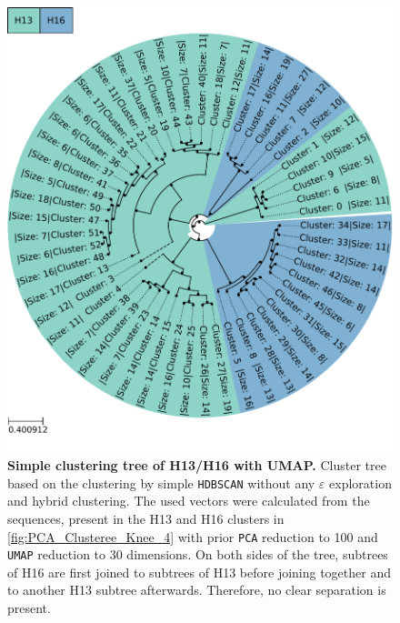 \begin{figure}[!hbt]
    \centering
    \includegraphics[width=\textwidth]{UMAP/Clustertree_Segment_4_H_Simple.pdf}
    \caption[Simple clustering tree of H13/H16 with UMAP]{\textbf{Simple clustering tree of H13/H16 with UMAP.} Cluster tree based on the clustering by simple \texttt{HDBSCAN} without any $\varepsilon$ exploration and hybrid clustering. The used vectors were calculated from the sequences, present in the H13 and H16 clusters in \autoref{fig:PCA_Clusteree_Knee_4} with prior \texttt{PCA} reduction to 100 and \texttt{UMAP} reduction to 30 dimensions. On both sides of the tree, subtrees of H16 are first joined to subtrees of H13 before joining together and to another H13 subtree afterwards. Therefore, no clear separation is present.}
    \label{fig:Simple_Clustertree_UMAP}
\end{figure}

\FloatBarrier
\newpage

